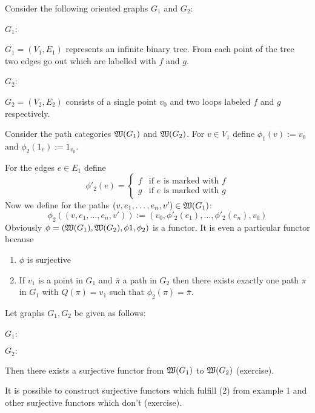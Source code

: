 \begin{example}
Consider the following oriented graphs $G_1$ and $G_2$:

$G_1$:
\begin{center}

\end{center}
$G_1 = (V_1, E_1)$ represents an infinite binary tree. From each point of the
tree two edges go out which are labelled with $f$ and $g$.

$G_2$:
\begin{center}

\end{center}
$G_2 = (V_2, E_2)$ consists of a single point $v_0$ and two loops labeled $f$ and $g$ respectively.

Consider the path categories $\mbox{$\mathfrak{W}({G_1})$}$ and $\mbox{$\mathfrak{W}({G_2})$}$. For $v
\in V_1$ define $\phi_1(v) := v_0$ and $\phi_2(1_v) := 1_{v_0}$.

For the edges $e \in E_1$ define
\[ \phi'_2(e) = 
\begin{cases}
	f & \text{if $e$ is marked with $f$} \\ 
	g & \text{if $e$ is marked with $g$}
\end{cases} 
\]
Now we define for the paths $(v, e_1, \ldots, e_n, v') \in \mbox{$\mathfrak{W}({G_1})$}$:
\[ \phi_2((v, e_1, \ldots, e_n, v')) := (v_0, \phi'_2(e_1), \ldots,
\phi'_2(e_n), v_0) 
\]
Obviously $\phi = (\mbox{$\mathfrak{W}({G_1})$}, \mbox{$\mathfrak{W}({G_2})$}, \phi1, \phi_2)$ is a
functor. It is even a particular functor because
\begin{enumerate}
  \item $\phi$ is surjective
  \item If $v_1$ is a point in $G_1$ and $\bar{\pi}$ a path in $G_2$ then
  there exists exactly one path $\pi$ in $G_1$ with $Q(\pi) = v_1$ such that
  $\phi_2(\pi) = \bar{\pi}$.
\end{enumerate}
\end{example}

\bigskip
\begin{example}
Let graphs $G_1, G_2$ be given as follows:

$G_1$:
\begin{center}

\end{center}

$G_2:$
\begin{center}

\end{center}
Then there exists a surjective functor from $\mbox{$\mathfrak{W}({G_1})$}$ to $\mbox{$\mathfrak{W}({G_2})$}$
(exercise).

It is possible to construct surjective functors which fulfill (2) from example 1
and other surjective functors which don't (exercise).
\end{example}

